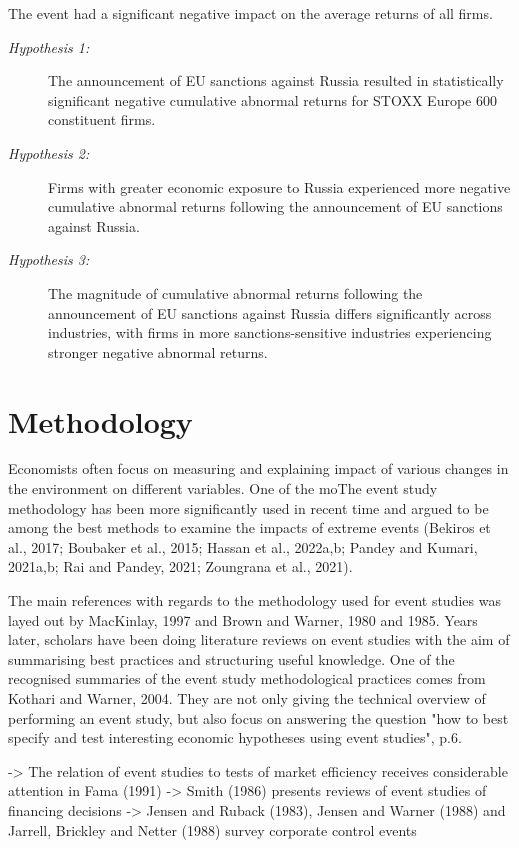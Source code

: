 \documentclass[12pt,a4paper]{article}
\begin{document}
The event had a significant negative impact on the average returns of all firms.

\begin{description}

\item[\emph{Hypothesis 1:}]
The announcement of EU sanctions against Russia resulted in statistically significant negative cumulative abnormal returns for STOXX Europe 600 constituent firms.

\item[\emph{Hypothesis 2:}]
Firms with greater economic exposure to Russia experienced more negative cumulative abnormal returns following the announcement of EU sanctions against Russia.

\item[\emph{Hypothesis 3:}]
The magnitude of cumulative abnormal returns following the announcement of EU sanctions against Russia differs significantly across industries, with firms in more sanctions-sensitive industries experiencing stronger negative abnormal returns.

\end{description}

\section{Methodology}

Economists often focus on measuring and explaining impact of various changes in the environment on different variables. One of the moThe event study methodology has been more significantly used in recent time and argued to be among the best methods to examine the impacts of extreme events (Bekiros et al., 2017; Boubaker et al., 2015; Hassan et al., 2022a,b; Pandey and Kumari, 2021a,b; Rai and Pandey, 2021; Zoungrana et al., 2021). 


The main references with regards to the methodology used for event studies was layed out by MacKinlay, 1997 and Brown and Warner, 1980 and 1985. Years later, scholars have been doing literature reviews on event studies with the aim of summarising best practices and structuring useful knowledge. One of the recognised summaries of the event study methodological practices comes from  Kothari and Warner, 2004. They are not only giving the technical overview of performing an event study, but also focus on answering the question "how to best specify and test interesting economic hypotheses using event studies", p.6. 


-> The relation of event studies to tests of market efficiency receives considerable attention in Fama (1991)
-> Smith (1986) presents reviews of event studies of financing decisions
-> Jensen and Ruback (1983), Jensen and Warner (1988) and Jarrell, Brickley and Netter (1988) survey corporate control events
\end{document}
